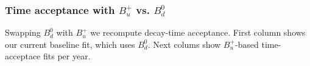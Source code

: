\begin{frame}
\frametitle{Time acceptance with $B_u^+$ vs. $B_d^0$}
\footnotesize

Swapping $B_d^0$ with $B_u^+$ we recompute decay-time acceptance.
First column shows our current baseline fit, which uses $B_d^0$. Next colums
show $B_u^+$-based time-acceptace fits per year.

\medskip

% 


\end{frame}



